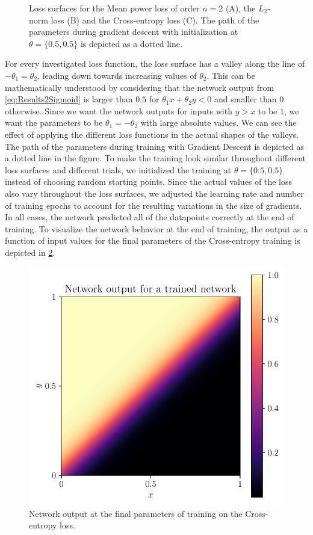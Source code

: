 \begin{figure}
	\caption{Loss surfaces for the Mean power loss of order $n=2$ (A), the $L_2$-norm loss (B) and the Cross-entropy loss (C). The path of the parameters during gradient descent with initialization at $\theta = \{0.5, 0.5\}$ is depicted as a dotted line.}
	\label{fig:Results2LossSurfaces}
\end{figure}
For every investigated loss function, the loss surface has a valley along the line of $-\theta_1 = \theta_2$, leading down towards increasing values of  $\theta_2$. This can be mathematically understood by considering that the network output from \cref{eq:Results2Sigmoid} is larger than $0.5$ for $\theta_1x + \theta_2y < 0$ and smaller than $0$ otherwise. Since we want the network outputs for inputs with $y>x$ to be $1$, we want the parameters to be $\theta_1 = - \theta_2$ with large absolute values. We can see the effect of applying the different loss functions in the actual shapes of the valleys.\\
The path of the parameters during training with Gradient Descent is depicted as a dotted line in the figure. To make the training look similar throughout different loss surfaces and different trials, we initialized the training at $\theta = \{0.5, 0.5\}$ instead of choosing random starting points. Since the actual values of the loss also vary throughout the loss surfaces, we adjusted the learning rate and number of training epochs to account for the resulting variations in the size of gradients. In all cases, the network predicted all of the datapoints correctly at the end of training. To visualize the network behavior at the end of training, the output as a function of input values for the final parameters of the Cross-entropy training is depicted in \cref{fig:Results2NetworkOutput}.
\begin{figure}
	\centering
	\includegraphics{Experiment2/plots/Network_output.pdf}
	\caption{Network output at the final parameters of training on the Cross-entropy loss.}
	\label{fig:Results2NetworkOutput}	
\end{figure}
